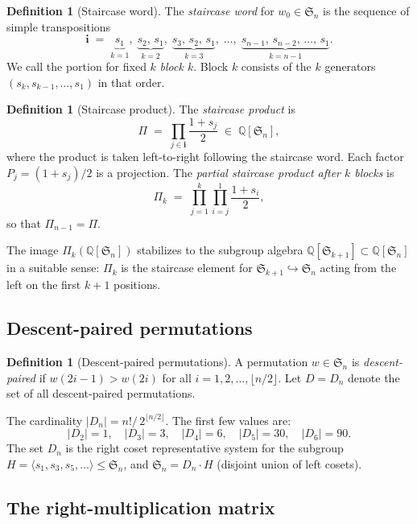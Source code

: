 \documentclass[11pt]{article}
\theoremstyle{definition}
\newtheorem{definition}[theorem]{Definition}
\theoremstyle{remark}
\newcommand{\QQ}{\mathbb{Q}}
\newcommand{\Sym}{\mathfrak{S}}
\begin{document}
\begin{definition}[Staircase word]
The \emph{staircase word} for $w_0 \in \Sym_n$ is the sequence of
simple transpositions
\[
  \mathbf{i} \;=\;
  \underbrace{s_1}_{k=1},\;
  \underbrace{s_2,\, s_1}_{k=2},\;
  \underbrace{s_3,\, s_2,\, s_1}_{k=3},\;
  \ldots,\;
  \underbrace{s_{n-1},\, s_{n-2},\, \ldots,\, s_1}_{k=n-1}.
\]
We call the portion for fixed $k$ \emph{block $k$}.  Block $k$ consists
of the $k$ generators $(s_k, s_{k-1}, \ldots, s_1)$ in that order.
\end{definition}

\begin{definition}[Staircase product]
The \emph{staircase product} is
\[
  \Pi \;=\; \prod_{j \in \mathbf{i}} \frac{1 + s_j}{2}
  \;\in\; \QQ[\Sym_n],
\]
where the product is taken left-to-right following the staircase word.
Each factor $P_j = (1+s_j)/2$ is a projection.  The \emph{partial
staircase product after $k$ blocks} is
\[
  \Pi_k \;=\; \prod_{j=1}^{k} \prod_{i=j}^{1} \frac{1+s_i}{2},
\]
so that $\Pi_{n-1} = \Pi$.
\end{definition}

The image $\Pi_k(\QQ[\Sym_n])$ stabilizes to the subgroup algebra
$\QQ[\Sym_{k+1}] \subset \QQ[\Sym_n]$ in a suitable sense: $\Pi_k$
is the staircase element for $\Sym_{k+1} \hookrightarrow \Sym_n$
acting from the left on the first $k+1$ positions.

\subsection{Descent-paired permutations}

\begin{definition}[Descent-paired permutations]
A permutation $w \in \Sym_n$ is \emph{descent-paired} if
$w(2i-1) > w(2i)$ for all $i = 1, 2, \ldots, \lfloor n/2 \rfloor$.
Let $D = D_n$ denote the set of all descent-paired permutations.
\end{definition}

The cardinality $|D_n| = n!/\,2^{\lfloor n/2 \rfloor}$.  The first
few values are:
\[
  |D_2| = 1,\quad |D_3| = 3,\quad |D_4| = 6,\quad
  |D_5| = 30,\quad |D_6| = 90.
\]
The set $D_n$ is the right coset representative system for the
subgroup $H = \langle s_1, s_3, s_5, \ldots \rangle \le \Sym_n$,
and $\Sym_n = D_n \cdot H$ (disjoint union of left cosets).

\subsection{The right-multiplication matrix}
\end{document}
